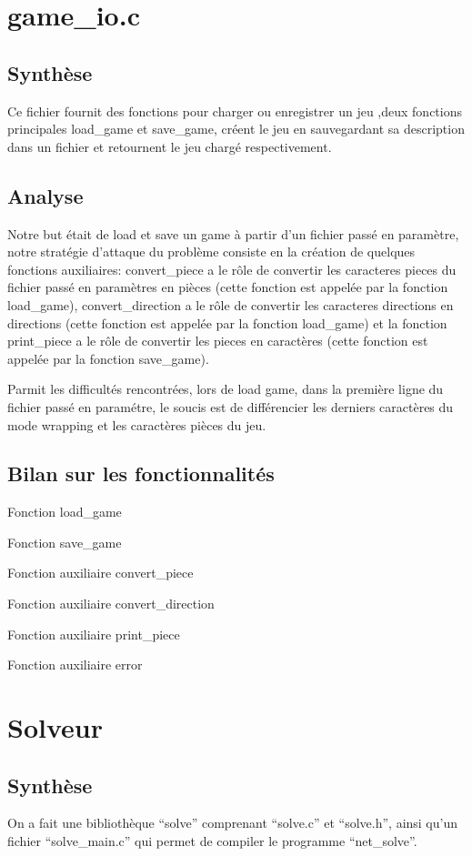 \documentclass[12pt]{article}
\begin{document}
\section{game\_io.c}
\subsection{Synthèse}
Ce fichier fournit des fonctions pour charger ou enregistrer un jeu ,deux fonctions principales load\_game et save\_game, créent le jeu en sauvegardant sa description dans un fichier et retournent le jeu chargé respectivement.
\subsection{Analyse}
Notre but était de load et save un game à partir d'un fichier passé en paramètre, notre stratégie d'attaque du problème consiste en la création de quelques fonctions auxiliaires: convert\_piece a le rôle de convertir les caracteres pieces du fichier passé en paramètres en pièces (cette fonction est appelée par la fonction load\_game), convert\_direction a le rôle de convertir les caracteres directions en directions (cette fonction est appelée par la fonction load\_game) et la fonction print\_piece a le rôle de convertir les pieces en caractères (cette fonction est appelée par la fonction save\_game).

Parmit les difficultés rencontrées, lors de load game, dans la première ligne du fichier passé en paramétre, le soucis est de différencier les derniers caractères du mode wrapping et les caractères pièces du jeu.
\subsection{Bilan sur les fonctionnalités}
Fonction load\_game

Fonction save\_game

Fonction auxiliaire convert\_piece

Fonction auxiliaire convert\_direction

Fonction auxiliaire print\_piece

Fonction auxiliaire error
 


\section{Solveur}
\subsection{Synthèse}
On a fait une bibliothèque ``solve'' comprenant ``solve.c'' et ``solve.h'', ainsi qu'un fichier ``solve\_main.c'' qui permet de compiler le programme ``net\_solve''.
\end{document}
